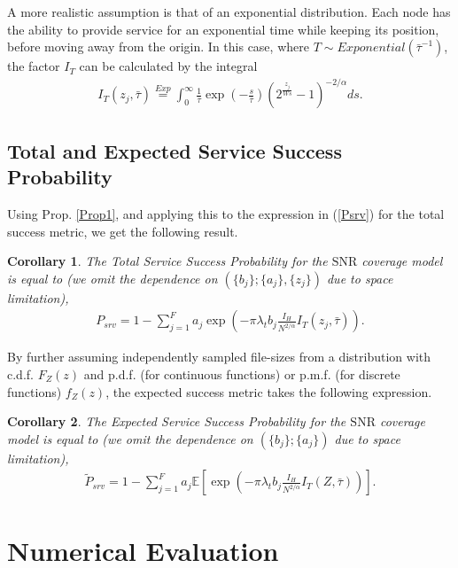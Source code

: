 \documentclass[conference]{IEEEtran}
\newtheorem{Cor}{Corollary}
\begin{document}
A more realistic assumption is that of an exponential distribution. Each node has the ability to provide service for an exponential time while keeping its position, before moving away from the origin. In this case, where $T\sim Exponential(\bar{\tau}^{-1})$, the factor $I_T$ can be calculated by the integral 
 \begin{eqnarray}
 \label{ITexp}
 I_T(z_j,\bar{\tau}) \overset{Exp}{=} \int_{0}^{\infty} \frac{1}{\bar{\tau}} \exp(-\frac{s}{\bar{\tau}}) \left(2^{\frac{z_j}{Ws}}-1\right)^{-2/ \alpha} ds.
\end{eqnarray}

\subsection{Total and Expected Service Success Probability}
Using Prop. \ref{Prop1}, and applying this to the expression in (\ref{Psrv}) for the total success metric, we get the following result. 

\begin{Cor}
\label{Cor1}
The Total Service Success Probability for the $\mathrm{SNR}$ coverage model is equal to (we omit the dependence on $\left(\{b_j\};\{a_j\},\{z_j\}\right)$ due to space limitation),
\begin{eqnarray}
\label{TotCor1}
P_{srv} = 1-\sum_{j=1}^F a_j\exp\left(-\pi\lambda_t b_j \frac{I_H}{N^{2/\alpha}} I_T(z_j,\bar{\tau})\right).
\end{eqnarray}
\end{Cor}

By further assuming independently sampled file-sizes from a distribution with c.d.f. $F_Z(z)$ and p.d.f. (for continuous functions) or p.m.f. (for discrete functions) $f_Z(z)$, the expected success metric  takes the following expression.

\begin{Cor}
\label{Cor2}
The Expected Service Success Probability for the $\mathrm{SNR}$ coverage model is equal to (we omit the dependence on $\left(\{b_j\};\{a_j\}\right)$ due to space limitation),
\begin{eqnarray}
\label{ETotCor1}
\tilde{P}_{srv} = 1-\sum_{j=1}^F a_j\mathbb{E}\left[\exp\left(-\pi\lambda_t b_j \frac{I_H}{N^{2/\alpha}} I_T(Z,\bar{\tau})\right)\right].
\end{eqnarray}
\end{Cor}


\section{Numerical Evaluation}
\label{secV}
\end{document}
